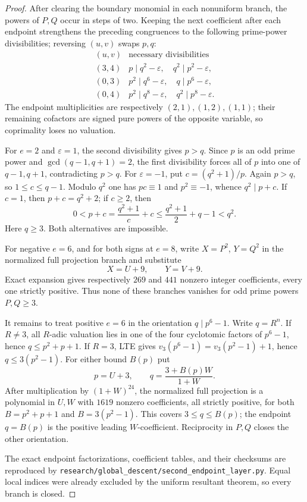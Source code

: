 \documentclass[11pt]{article}
\begin{document}
\begin{proof}
After clearing the boundary monomial in each nonuniform branch, the powers of
$P,Q$ occur in steps of two.  Keeping the next coefficient after each
endpoint strengthens the preceding congruences to the following
prime-power divisibilities; reversing $(u,v)$ swaps $p,q$:
\[
\begin{array}{c|c}
(u,v)&\text{necessary divisibilities}\\ \hline
(3,4)&p\mid q^2-\varepsilon,\quad q^2\mid p^2-\varepsilon,\\
(0,3)&p^2\mid q^6-\varepsilon,\quad q\mid p^6-\varepsilon,\\
(0,4)&p^2\mid q^8-\varepsilon,\quad q^2\mid p^8-\varepsilon.
\end{array}
\]
The endpoint multiplicities are respectively $(2,1),(1,2),(1,1)$;
their remaining cofactors are signed pure powers of the opposite variable,
so coprimality loses no valuation.

For $e=2$ and $\varepsilon=1$, the second divisibility gives $p>q$.
Since $p$ is an odd prime power and
$\gcd(q-1,q+1)=2$, the first divisibility forces all of $p$ into one of
$q-1,q+1$, contradicting $p>q$.  For $\varepsilon=-1$, put
$c=(q^2+1)/p$.  Again $p>q$, so $1\leq c\leq q-1$.  Modulo $q^2$ one has
$pc\equiv1$ and $p^2\equiv-1$, whence $q^2\mid p+c$.  If $c=1$, then
$p+c=q^2+2$; if $c\geq2$, then
\[
0<p+c=\frac{q^2+1}{c}+c
\leq\frac{q^2+1}{2}+q-1<q^2.
\]
Here $q\geq3$.  Both alternatives are impossible.

For negative $e=6$, and for both signs at $e=8$, write
$X=P^2$, $Y=Q^2$ in the normalized full projection branch and substitute
\[
X=U+9,\qquad Y=V+9.
\]
Exact expansion gives respectively $269$ and $441$ nonzero integer
coefficients, every one strictly positive.  Thus none of these branches
vanishes for odd prime powers $P,Q\geq3$.

It remains to treat positive $e=6$ in the orientation
$q\mid p^6-1$.  Write $q=R^n$.  If $R\ne3$, all $R$-adic valuation lies in
one of the four cyclotomic factors of $p^6-1$, hence
$q\leq p^2+p+1$.  If $R=3$, LTE gives
$v_3(p^6-1)=v_3(p^2-1)+1$, hence $q\leq3(p^2-1)$.
For either bound $B(p)$ put
\[
p=U+3,\qquad q=\frac{3+B(p)W}{1+W}.
\]
After multiplication by $(1+W)^{24}$, the normalized full projection is a
polynomial in $U,W$ with $1619$ nonzero coefficients, all strictly positive,
for both $B=p^2+p+1$ and $B=3(p^2-1)$.  This covers
$3\leq q\leq B(p)$; the endpoint $q=B(p)$ is the positive leading
$W$-coefficient.  Reciprocity in $P,Q$ closes the other orientation.

The exact endpoint factorizations, coefficient tables, and their checksums
are reproduced by
\texttt{research/global\_descent/second\_endpoint\_layer.py}.
Equal local indices were already excluded by the uniform resultant theorem,
so every branch is closed.
\end{proof}
\end{document}
